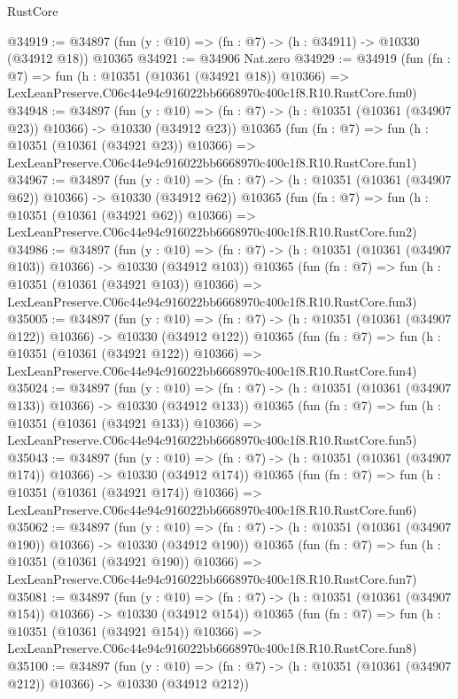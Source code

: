 \begin{lexlean}{RustCore}
\begin{coremodule}
@34919 := @34897 (fun (y : @10) => (fn : @7) -> (h : @34911) -> @10330 (@34912 @18)) @10365
@34921 := @34906 Nat.zero
@34929 := @34919
    (fun (fn : @7) =>
    fun (h : @10351 (@10361 (@34921 @18)) @10366) =>
    LexLeanPreserve.C06c44e94c916022bb6668970c400c1f8.R10.RustCore.fun0)
@34948 := @34897
    (fun (y : @10) => (fn : @7) -> (h : @10351 (@10361 (@34907 @23)) @10366) -> @10330 (@34912 @23))
    @10365
    (fun (fn : @7) =>
    fun (h : @10351 (@10361 (@34921 @23)) @10366) =>
    LexLeanPreserve.C06c44e94c916022bb6668970c400c1f8.R10.RustCore.fun1)
@34967 := @34897
    (fun (y : @10) => (fn : @7) -> (h : @10351 (@10361 (@34907 @62)) @10366) -> @10330 (@34912 @62))
    @10365
    (fun (fn : @7) =>
    fun (h : @10351 (@10361 (@34921 @62)) @10366) =>
    LexLeanPreserve.C06c44e94c916022bb6668970c400c1f8.R10.RustCore.fun2)
@34986 := @34897
    (fun (y : @10) =>
    (fn : @7) -> (h : @10351 (@10361 (@34907 @103)) @10366) -> @10330 (@34912 @103))
    @10365
    (fun (fn : @7) =>
    fun (h : @10351 (@10361 (@34921 @103)) @10366) =>
    LexLeanPreserve.C06c44e94c916022bb6668970c400c1f8.R10.RustCore.fun3)
@35005 := @34897
    (fun (y : @10) =>
    (fn : @7) -> (h : @10351 (@10361 (@34907 @122)) @10366) -> @10330 (@34912 @122))
    @10365
    (fun (fn : @7) =>
    fun (h : @10351 (@10361 (@34921 @122)) @10366) =>
    LexLeanPreserve.C06c44e94c916022bb6668970c400c1f8.R10.RustCore.fun4)
@35024 := @34897
    (fun (y : @10) =>
    (fn : @7) -> (h : @10351 (@10361 (@34907 @133)) @10366) -> @10330 (@34912 @133))
    @10365
    (fun (fn : @7) =>
    fun (h : @10351 (@10361 (@34921 @133)) @10366) =>
    LexLeanPreserve.C06c44e94c916022bb6668970c400c1f8.R10.RustCore.fun5)
@35043 := @34897
    (fun (y : @10) =>
    (fn : @7) -> (h : @10351 (@10361 (@34907 @174)) @10366) -> @10330 (@34912 @174))
    @10365
    (fun (fn : @7) =>
    fun (h : @10351 (@10361 (@34921 @174)) @10366) =>
    LexLeanPreserve.C06c44e94c916022bb6668970c400c1f8.R10.RustCore.fun6)
@35062 := @34897
    (fun (y : @10) =>
    (fn : @7) -> (h : @10351 (@10361 (@34907 @190)) @10366) -> @10330 (@34912 @190))
    @10365
    (fun (fn : @7) =>
    fun (h : @10351 (@10361 (@34921 @190)) @10366) =>
    LexLeanPreserve.C06c44e94c916022bb6668970c400c1f8.R10.RustCore.fun7)
@35081 := @34897
    (fun (y : @10) =>
    (fn : @7) -> (h : @10351 (@10361 (@34907 @154)) @10366) -> @10330 (@34912 @154))
    @10365
    (fun (fn : @7) =>
    fun (h : @10351 (@10361 (@34921 @154)) @10366) =>
    LexLeanPreserve.C06c44e94c916022bb6668970c400c1f8.R10.RustCore.fun8)
@35100 := @34897
    (fun (y : @10) =>
    (fn : @7) -> (h : @10351 (@10361 (@34907 @212)) @10366) -> @10330 (@34912 @212))

\end{coremodule}
\end{lexlean}
